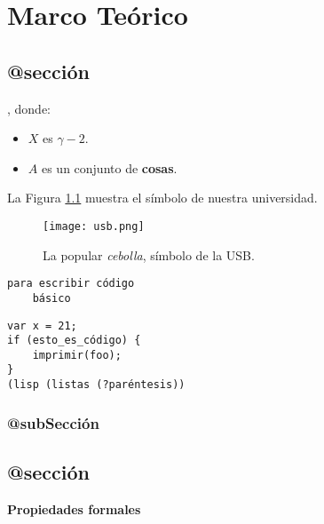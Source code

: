 \chapter{Marco Teórico}
\label{ch:marco-teorico}


\section{@sección}
\begin{definition}
\label{definicion1}
\blindtext, donde:
\begin{itemize}
\item $X$ es $\gamma - 2$.
\item $A$ es un conjunto de \textbf{cosas}.
\end{itemize}
\end{definition}

La Figura \ref{usb} muestra el símbolo de nuestra universidad.
\begin{figure}[h!]
\centering
\texttt{[image: usb.png]}
\caption[La popular \textit{cebolla}]{La popular \textit{cebolla}, símbolo de la USB.}
\label{usb}
\end{figure}

\begin{verbatim}
para escribir código
    básico
\end{verbatim}
\Blindtext

\begin{Verbatim}[commandchars=\\\{\}, codes={\catcode`$=3\catcode`^=7}]
var x = 21;
if (esto_es_código) {
    imprimir(foo);
}
(lisp (listas (?paréntesis))
\end{Verbatim}

\blindtext
\subsection{@subSección}
\Blindtext

\section{@sección}
\blindtext

\begin{mdframed}
\begin{theorem}
\label{principal}
\textbf{Propiedades formales}
\blindenumerate
\end{theorem}
\end{mdframed}


